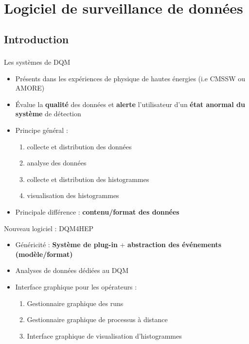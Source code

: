 \documentclass[8pt]{beamer}
\begin{document}
    \section{Logiciel de surveillance de données}

    \begin{frame}
    \frametitle{\secname}
      \tableofcontents[currentsection]
    \end{frame}

    \subsection{Introduction}

    \begin{frame}
    \frametitle{\secname}
    \framesubtitle{\subsecname}
    \small
      \begin{block}{Les systèmes de DQM}
        \begin{itemize}
          \item Présents dans les expériences de physique de hautes énergies (i.e CMSSW ou AMORE)
          \item Évalue la \textbf{qualité} des données et \textbf{alerte} l'utilisateur d'un \textbf{état anormal du système} de détection
          \item Principe général :
          \begin{enumerate}
            \item collecte et distribution des données
            \item analyse des données
            \item collecte et distribution des histogrammes
            \item visualisation des histogrammes
          \end{enumerate}
          \item Principale différence : \textbf{contenu/format des données}
        \end{itemize}
      \end{block}
      \begin{block}{Nouveau logiciel : DQM4HEP}
        \begin{itemize}
          \item Généricité : \textbf{Système de plug-in} + \textbf{abstraction des événements (modèle/format)}
          \item Analyses de données dédiées au DQM
          \item Interface graphique pour les opérateurs :
          \begin{enumerate}
            \item Gestionnaire graphique des runs
            \item Gestionnaire graphique de processus à distance
            \item Interface graphique de visualisation d'histogrammes
          \end{enumerate}
        \end{itemize}
      \end{block}
    \end{frame}
\end{document}
